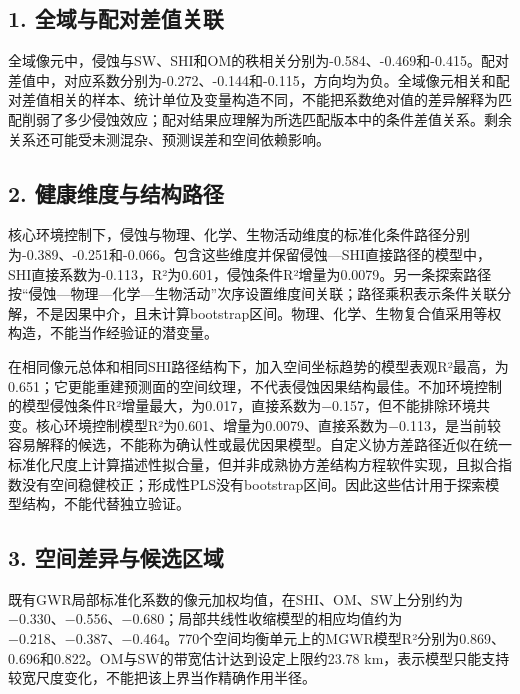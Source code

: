\documentclass[
  a4paper,
  12pt]{ctexart}
\begin{document}
\hypertarget{ux5168ux57dfux4e0eux914dux5bf9ux5deeux503cux5173ux8054}{%
\subsection{1.
全域与配对差值关联}\label{ux5168ux57dfux4e0eux914dux5bf9ux5deeux503cux5173ux8054}}

全域像元中，侵蚀与SW、SHI和OM的秩相关分别为-0.584、-0.469和-0.415。配对差值中，对应系数分别为-0.272、-0.144和-0.115，方向均为负。全域像元相关和配对差值相关的样本、统计单位及变量构造不同，不能把系数绝对值的差异解释为匹配削弱了多少侵蚀效应；配对结果应理解为所选匹配版本中的条件差值关系。剩余关系还可能受未测混杂、预测误差和空间依赖影响。

\hypertarget{ux5065ux5eb7ux7ef4ux5ea6ux4e0eux7ed3ux6784ux8defux5f84}{%
\subsection{2.
健康维度与结构路径}\label{ux5065ux5eb7ux7ef4ux5ea6ux4e0eux7ed3ux6784ux8defux5f84}}

核心环境控制下，侵蚀与物理、化学、生物活动维度的标准化条件路径分别为-0.389、-0.251和-0.066。包含这些维度并保留侵蚀---SHI直接路径的模型中，SHI直接系数为-0.113，R²为0.601，侵蚀条件R²增量为0.0079。另一条探索路径按``侵蚀---物理---化学---生物活动''次序设置维度间关联；路径乘积表示条件关联分解，不是因果中介，且未计算bootstrap区间。物理、化学、生物复合值采用等权构造，不能当作经验证的潜变量。

在相同像元总体和相同SHI路径结构下，加入空间坐标趋势的模型表观R²最高，为0.651；它更能重建预测面的空间纹理，不代表侵蚀因果结构最佳。不加环境控制的模型侵蚀条件R²增量最大，为0.017，直接系数为−0.157，但不能排除环境共变。核心环境控制模型R²为0.601、增量为0.0079、直接系数为−0.113，是当前较容易解释的候选，不能称为确认性或最优因果模型。自定义协方差路径近似在统一标准化尺度上计算描述性拟合量，但并非成熟协方差结构方程软件实现，且拟合指数没有空间稳健校正；形成性PLS没有bootstrap区间。因此这些估计用于探索模型结构，不能代替独立验证。

\hypertarget{ux7a7aux95f4ux5deeux5f02ux4e0eux5019ux9009ux533aux57df}{%
\subsection{3.
空间差异与候选区域}\label{ux7a7aux95f4ux5deeux5f02ux4e0eux5019ux9009ux533aux57df}}

既有GWR局部标准化系数的像元加权均值，在SHI、OM、SW上分别约为−0.330、−0.556、−0.680；局部共线性收缩模型的相应均值约为−0.218、−0.387、−0.464。770个空间均衡单元上的MGWR模型R²分别为0.869、0.696和0.822。OM与SW的带宽估计达到设定上限约23.78
km，表示模型只能支持较宽尺度变化，不能把该上界当作精确作用半径。
\end{document}
